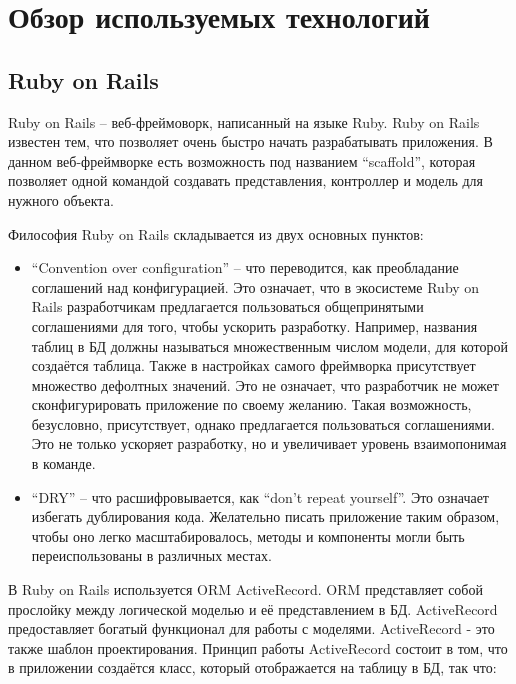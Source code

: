\lstset{style=fsharpstyle}

\section{Обзор используемых технологий}
\label{sec:technologies}

\subsection{Ruby on Rails}
\label{sub:technologies:ruby_on_rails}
Ruby on Rails -- веб-фреймоворк, написанный на языке Ruby. Ruby on Rails известен тем, что позволяет очень быстро начать разрабатывать приложения. В данном веб-фреймворке есть возможность под названием ``scaffold'', которая позволяет одной командой создавать представления, контроллер и модель для нужного объекта.

Философия Ruby on Rails складывается из двух основных пунктов:

\begin{itemize}
  \item ``Convention over configuration'' -- что переводится, как преобладание соглашений над конфигурацией. Это означает, что в экосистеме Ruby on Rails разработчикам предлагается пользоваться общепринятыми соглашениями для того, чтобы ускорить разработку. Например, названия таблиц в БД должны называться множественным числом модели, для которой создаётся таблица. Также в настройках самого фреймворка присутствует множество дефолтных значений. Это не означает, что разработчик не может сконфигурировать приложение по своему желанию. Такая возможность, безусловно, присутствует, однако предлагается пользоваться соглашениями. Это не только ускоряет разработку, но и увеличивает уровень взаимопонимая в команде.
  \item ``DRY'' -- что расшифровывается, как ``don't repeat yourself''. Это означает избегать дублирования кода. Желательно писать приложение таким образом, чтобы оно легко масштабировалось, методы и компоненты могли быть переиспользованы в различных местах.
\end{itemize}

В Ruby on Rails используется ORM ActiveRecord. ORM представляет собой прослойку между логической моделью и её представлением в БД. ActiveRecord предоставляет богатый функционал для работы с моделями. ActiveRecord - это также шаблон проектирования. Принцип работы ActiveRecord состоит в том, что в приложении создаётся класс, который отображается на таблицу в БД, так что:

